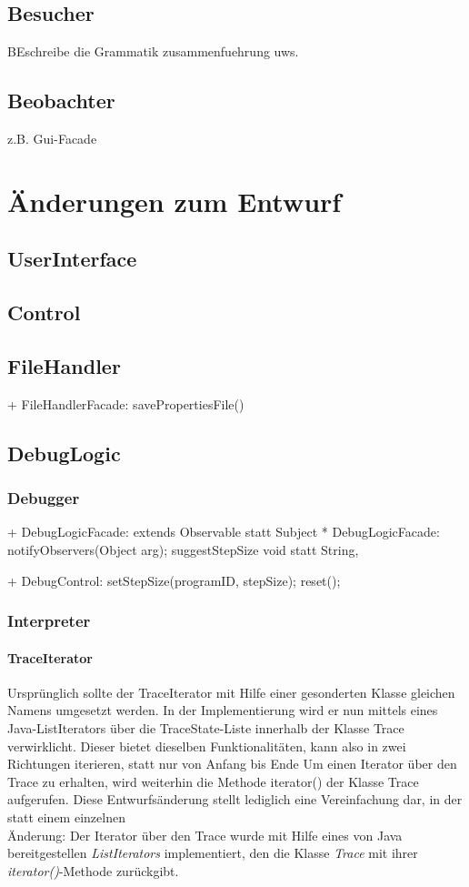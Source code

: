 \documentclass[parskip=full]{scrartcl}
\begin{document}
\subsection{Besucher} BEschreibe die Grammatik zusammenfuehrung uws.
\subsection{Beobachter}
z.B. Gui-Facade

\section{Änderungen zum Entwurf}

\subsection{UserInterface}
\subsection{Control}
\subsection{FileHandler}
+ FileHandlerFacade: savePropertiesFile()
\subsection{DebugLogic}
\subsubsection{Debugger}

+ DebugLogicFacade: extends Observable statt Subject
* DebugLogicFacade: notifyObservers(Object arg); suggestStepSize void statt String,

+ DebugControl: setStepSize(programID, stepSize); reset();
\subsubsection{Interpreter}
\paragraph{TraceIterator}
Ursprünglich sollte der TraceIterator mit Hilfe einer gesonderten Klasse gleichen Namens umgesetzt werden. In der Implementierung wird er nun mittels eines Java-ListIterators über die TraceState-Liste innerhalb der Klasse Trace verwirklicht. Dieser bietet dieselben Funktionalitäten, kann also in zwei Richtungen iterieren, statt nur von Anfang bis Ende Um einen Iterator über den Trace zu erhalten, wird weiterhin die Methode iterator() der Klasse Trace aufgerufen. Diese Entwurfsänderung stellt lediglich eine Vereinfachung dar, in der statt einem einzelnen\\
Änderung: Der Iterator über den Trace wurde mit Hilfe eines von Java bereitgestellen \textit{ListIterators} implementiert, den die Klasse \textit{Trace} mit ihrer \textit{iterator()}-Methode zurückgibt.
\end{document}
